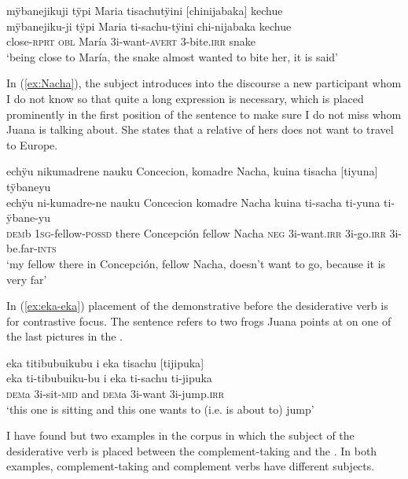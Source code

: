 \ea\label{ex:want-bite}
\begingl
\glpreamble mÿbanejikuji tÿpi Maria tisachutÿini \textup{[}chinijabaka\textup{]} kechue\\
\gla mÿbanejiku-ji tÿpi Maria ti-sachu-tÿini chi-nijabaka kechue\\
\glb close-\textsc{rprt} \textsc{obl} María 3i-want-\textsc{avert} 3-bite.\textsc{irr} snake\\
\glft ‘being close to María, the snake almost wanted to bite her, it is said’
\endgl
\trailingcitation{[jxx-p120515l-2.161]}
\xe

In (\ref{ex:Nacha}), the subject introduces into the discourse a new participant whom I do not know so that quite a long expression is necessary, which is placed prominently in the first position of the sentence to make sure I do not miss whom Juana is talking about. She states that a relative of hers does not want to travel to Europe.

\ea\label{ex:Nacha}
\begingl
\glpreamble echÿu nikumadrene nauku Concecion, komadre Nacha, kuina tisacha \textup{[}tiyuna\textup{]} tÿbaneyu\\
\gla echÿu ni-kumadre-ne nauku Concecion komadre Nacha kuina ti-sacha ti-yuna ti-ÿbane-yu\\
\glb \textsc{dem}b 1\textsc{sg}-fellow-\textsc{possd} there Concepción fellow Nacha \textsc{neg} 3i-want.\textsc{irr} 3i-go.\textsc{irr} 3i-be.far-\textsc{ints}\\
\glft ‘my fellow there in Concepción, fellow Nacha, doesn’t want to go, because it is very far’
\endgl
\trailingcitation{[jxx-p120430l-1.175]}
\xe

In (\ref{ex:eka-eka}) placement of the demonstrative before the desiderative verb is for contrastive focus. The sentence refers to two frogs Juana points at on one of the last pictures in the .


\newpage %
\ea\label{ex:eka-eka}
\begingl
\glpreamble eka titibubuikubu i eka tisachu \textup{[}tijipuka\textup{]}\\
\gla eka ti-tibubuiku-bu i eka ti-sachu ti-jipuka\\
\glb \textsc{dem}a 3i-sit-\textsc{mid} and \textsc{dem}a 3i-want 3i-jump.\textsc{irr}\\
\glft ‘this one is sitting and this one wants to (i.e. is about to) jump’
\endgl
\trailingcitation{[jxx-a120516l-a.521-522]}
\xe


I have found but two examples in the corpus in which the subject of the desiderative verb is placed between the complement-taking and the . In both examples, complement-taking and complement verbs have different subjects.

